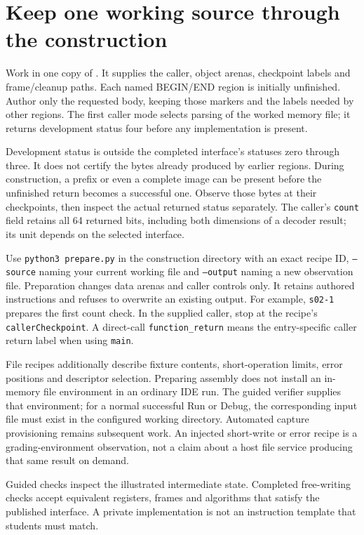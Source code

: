 \section{Keep one working source through the construction}
Work in one copy of . It supplies the caller,
object arenas, checkpoint labels and frame/cleanup paths. Each named BEGIN/END region
is initially unfinished. Author only the requested body, keeping those markers and the
labels needed by other regions. The first caller mode selects parsing of the worked
memory file; it returns development status four before any implementation is present.

Development status is outside the completed interface's statuses zero through three.
It does not certify the bytes already produced by earlier regions. During construction,
a prefix or even a complete image can be present before the unfinished return becomes
a successful one. Observe those bytes at their checkpoints, then inspect the actual
returned status separately. The caller's \texttt{count} field retains all 64 returned
bits, including both dimensions of a decoder result; its unit depends on the selected
interface.

Use \texttt{python3 prepare.py} in the construction directory with an exact recipe ID,
\texttt{--source} naming your current working file and \texttt{--output} naming a new
observation file. Preparation changes data arenas and caller controls only. It retains
authored instructions and refuses to overwrite an existing output. For example,
\texttt{s02-1} prepares the first count check. In the supplied caller, stop at the
recipe's \texttt{callerCheckpoint}. A direct-call \texttt{function\_return} means the
entry-specific caller return label when using \texttt{main}.

File recipes additionally describe fixture contents, short-operation limits, error
positions and descriptor selection. Preparing assembly does not install an in-memory
file environment in an ordinary IDE run. The guided verifier supplies that environment;
for a normal successful Run or Debug, the corresponding input file must exist in the
configured working directory. Automated capture provisioning remains subsequent work.
An injected short-write or error recipe is a grading-environment observation, not a
claim about a host file service producing that same result on demand.

Guided checks inspect the illustrated intermediate state. Completed free-writing checks
accept equivalent registers, frames and algorithms that satisfy the published interface.
A private implementation is not an instruction template that students must match.

